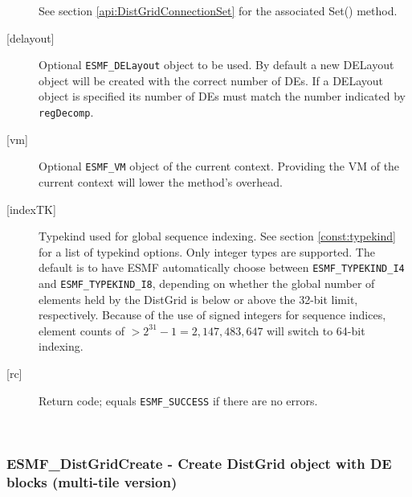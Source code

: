 \begin{description}
            See section \ref{api:DistGridConnectionSet} for the associated Set()
            method.
       \item[{[delayout]}]
            Optional {\tt ESMF\_DELayout} object to be used. By default a new
            DELayout object will be created with the correct number of DEs. If
            a DELayout object is specified its number of DEs must match the 
            number indicated by {\tt regDecomp}.
       \item[{[vm]}]
            Optional {\tt ESMF\_VM} object of the current context. Providing the
            VM of the current context will lower the method's overhead.
       \item[{[indexTK]}]
            Typekind used for global sequence indexing. See section 
            \ref{const:typekind} for a list of typekind options. Only integer
            types are supported. The default is to have ESMF automatically choose
            between {\tt ESMF\_TYPEKIND\_I4} and {\tt ESMF\_TYPEKIND\_I8},
            depending on whether the global number of elements held by the
            DistGrid is below or above the 32-bit limit, respectively.
            Because of the use of signed integers for sequence indices, 
            element counts of $ > 2^{31}-1 = 2,147,483,647$ will switch to 64-bit 
            indexing.
       \item[{[rc]}]
            Return code; equals {\tt ESMF\_SUCCESS} if there are no errors.
       \end{description}
   
 
\mbox{}\hrulefill\ 
 
\subsubsection [ESMF\_DistGridCreate] {ESMF\_DistGridCreate - Create DistGrid object with DE blocks (multi-tile version)}


